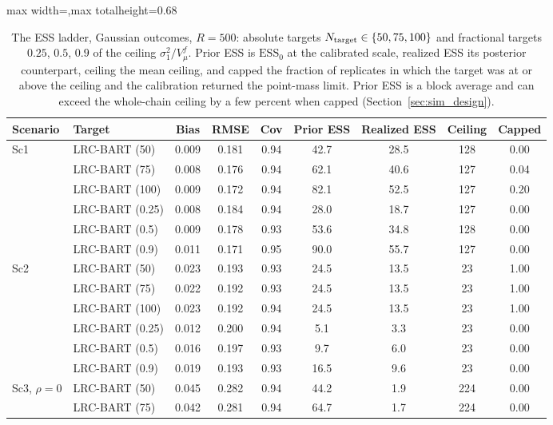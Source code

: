 \documentclass[11pt]{article}
\theoremstyle{definition}
\theoremstyle{plain}
\begin{document}
\begin{table}[htbp]
\centering
\singlespacing
\caption{The ESS ladder, Gaussian outcomes, $R=500$: absolute targets $N_{\rm target}\in\{50,75,100\}$ and fractional targets $0.25$, $0.5$, $0.9$ of the ceiling $\sigma_1^2/V_\mu^f$. Prior ESS is $\mathrm{ESS}_0$ at the calibrated scale, realized ESS its posterior counterpart, ceiling the mean ceiling, and capped the fraction of replicates in which the target was at or above the ceiling and the calibration returned the point-mass limit. Prior ESS is a block average and can exceed the whole-chain ceiling by a few percent when capped (Section~\ref{sec:sim_design}).}
\label{tab:ladder}
\scriptsize
\setlength{\tabcolsep}{4pt}
\renewcommand{\arraystretch}{0.8}
\begin{adjustbox}{max width=\textwidth,max totalheight=0.68\textheight}
\begin{tabular}{llccccccc}
\toprule
Scenario & Target & Bias & RMSE & Cov & Prior ESS & Realized ESS & Ceiling & Capped \\
\midrule
\multirow{6}{*}{Sc1} & LRC-BART (50) & 0.009 & 0.181 & 0.94 & 42.7 & 28.5 & 128 & 0.00 \\
& LRC-BART (75) & 0.008 & 0.176 & 0.94 & 62.1 & 40.6 & 127 & 0.04 \\
& LRC-BART (100) & 0.009 & 0.172 & 0.94 & 82.1 & 52.5 & 127 & 0.20 \\
& LRC-BART (0.25) & 0.008 & 0.184 & 0.94 & 28.0 & 18.7 & 127 & 0.00 \\
& LRC-BART (0.5) & 0.009 & 0.178 & 0.93 & 53.6 & 34.8 & 128 & 0.00 \\
& LRC-BART (0.9) & 0.011 & 0.171 & 0.95 & 90.0 & 55.7 & 127 & 0.00 \\
\midrule
\multirow{6}{*}{Sc2} & LRC-BART (50) & 0.023 & 0.193 & 0.93 & 24.5 & 13.5 & 23 & 1.00 \\
& LRC-BART (75) & 0.022 & 0.192 & 0.93 & 24.5 & 13.5 & 23 & 1.00 \\
& LRC-BART (100) & 0.023 & 0.192 & 0.94 & 24.5 & 13.5 & 23 & 1.00 \\
& LRC-BART (0.25) & 0.012 & 0.200 & 0.94 & 5.1 & 3.3 & 23 & 0.00 \\
& LRC-BART (0.5) & 0.016 & 0.197 & 0.93 & 9.7 & 6.0 & 23 & 0.00 \\
& LRC-BART (0.9) & 0.019 & 0.193 & 0.93 & 16.5 & 9.6 & 23 & 0.00 \\
\midrule
\multirow{6}{*}{Sc3, $\rho=0$} & LRC-BART (50) & 0.045 & 0.282 & 0.94 & 44.2 & 1.9 & 224 & 0.00 \\
& LRC-BART (75) & 0.042 & 0.281 & 0.94 & 64.7 & 1.7 & 224 & 0.00 \\

\end{tabular}
\end{adjustbox}
\end{table}
\end{document}
